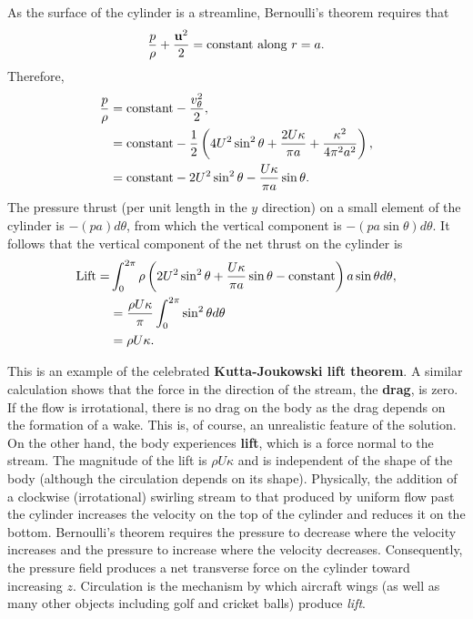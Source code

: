 \documentclass[10pt]{report}
\begin{document}
As the surface of the cylinder is a streamline, Bernoulli's theorem requires
that
\[
\frac{p}{\rho }+\frac{{{\bf u}}^2}{2}=\hbox{constant along } r=a.
\]
Therefore,
\begin{align*}
\frac{p}{\rho } & = \hbox{constant}-\frac{v_\theta ^2 }{2}, \\
& =\hbox{constant} -\frac{1}{2}\left( {4U^2\sin ^2\theta +\frac{2U\kappa }{\pi
a}+\frac{\kappa ^2}{4\pi ^2a^2}} \right), \\
& =\hbox{constant} -2U^2\sin ^2\theta -\frac{U\kappa }{\pi a}\sin \theta .
\end{align*}
The pressure thrust (per unit length in the $y$ direction) on a small element
of the cylinder is $-\left( {pa} \right)d\theta $, from which the vertical
component is $-\left( {pa\sin \theta } \right)d\theta $.
It follows that the vertical component of the net thrust on the cylinder is
\begin{align*}
\hbox{Lift} = & \int_0^{2\pi } \rho \left( {2U^2\sin ^2\theta +\frac{U\kappa }{\pi
a}\sin \theta -\hbox{constant}} \right)a\sin \theta d\theta , \\
& =\frac{\rho U\kappa }{\pi }\int_0^{2\pi } {\sin ^2\theta } d\theta  \\
& =\rho U\kappa.
\end{align*}

This is an example of the celebrated \textbf{Kutta-Joukowski lift theorem}.
A similar calculation shows that the force in the direction of the stream,
the \textbf{drag}, is zero. If the flow is irrotational, there is no drag on
the body as the drag depends on the formation of a wake. This is, of course,
an unrealistic feature of the solution. On the other hand, the body
experiences \textbf{lift}, which is a force normal to the stream. The
magnitude of the lift is $\rho U\kappa $ and is independent of the shape
of the body (although the circulation depends on its shape). Physically, the
addition of a clockwise (irrotational) swirling stream to that produced by
uniform flow past the cylinder increases the velocity on the top of the
cylinder and reduces it on the bottom. Bernoulli's theorem requires the
pressure to decrease where the velocity increases and the pressure to
increase where the velocity decreases. Consequently, the pressure field
 produces a net transverse force on the
cylinder toward increasing $z$. Circulation is the mechanism by which aircraft
wings (as well as many other objects including golf and cricket balls)
produce \textit{lift}.
\end{document}
